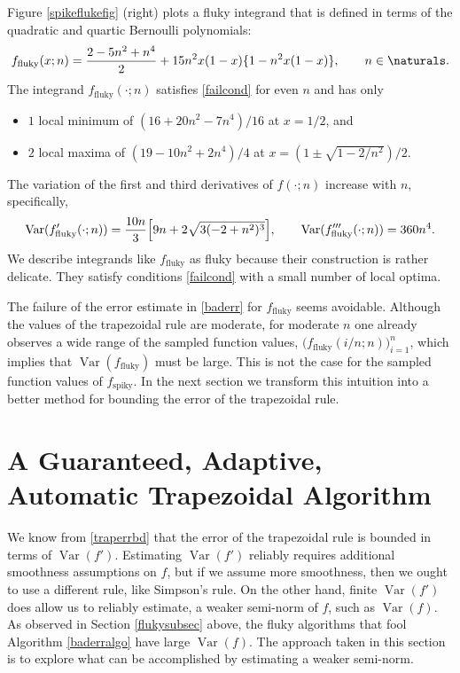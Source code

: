 \documentclass[]{amsart}
\DeclareMathOperator{\Var}{Var}
\theoremstyle{definition}
\theoremstyle{remark}
\begin{document}
Figure \ref{spikeflukefig} (right) plots a fluky integrand that is defined in terms of the quadratic and quartic Bernoulli polynomials:
\begin{equation} \label{fluky}
f_{\text{fluky}}(x;n) = \frac{2 - 5 n^2 + n^4}{2}+ 15n^2 x(1-x)\{1 - n^2 x(1-x)\}, \qquad n \in \naturals.
\end{equation}
The integrand $f_{\text{fluky}}(\cdot;n)$ satisfies \eqref{failcond} for even $n$ and has only 
\begin{itemize}
\item $1$ local minimum of $(16 + 20 n^2 - 7 n^4)/16$ at $x=1/2$, and
\item $2$ local maxima of $(19 - 10 n^2 + 2 n^4)/4$ at $x=(1 \pm \sqrt{1 -2/n^2})/2$.
\end{itemize}
The variation of the first and third derivatives of $f(\cdot;n)$ increase with $n$, specifically,
\begin{equation*}
\Var(f'_{\text{fluky}}(\cdot;n))= \frac{10 n}{3}  \Bigl[9 n + 2 \sqrt{3(-2 + n^2)^3} \Bigr ], \qquad
\Var(f'''_{\text{fluky}}(\cdot;n))= 360n^4.
\end{equation*}
We describe integrands like $f_{\text{fluky}}$ as fluky because their construction is rather delicate.  They satisfy conditions \eqref{failcond} with a small number of local optima.  

The failure of the error estimate in \eqref{baderr} for $f_{\text{fluky}}$ seems avoidable. Although the values of the trapezoidal rule are moderate, for moderate $n$ one already observes a wide range of the sampled function values, $\bigl(f_{\text{fluky}}(i/n;n)\bigr)_{i=1}^{n}$, which implies that $\Var(f_{\text{fluky}})$ must be large.  This is not the case for the sampled function values of $f_{\text{spiky}}$.  In the next section we transform this intuition into a better method for bounding the error of the trapezoidal rule.


\section{A Guaranteed, Adaptive, Automatic Trapezoidal Algorithm} \label{newalgosec}

We know from \eqref{traperrbd} that the error of the trapezoidal rule is bounded in terms of $\Var(f')$.  Estimating $\Var(f')$ reliably requires additional smoothness assumptions on $f$, but if we assume more smoothness, then we ought to use a different rule, like Simpson's rule.  On the other hand, finite $\Var(f')$ does allow us to reliably estimate, a weaker semi-norm of $f$, such as $\Var(f)$.  As observed in Section \ref{flukysubsec} above, the fluky algorithms that fool Algorithm \ref{baderralgo} have large $\Var(f)$.  The approach taken in this section is to explore what can be accomplished by estimating a weaker semi-norm.
\end{document}
